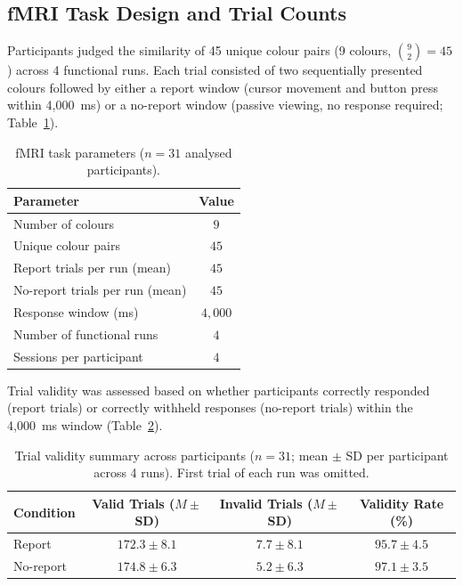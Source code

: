 \documentclass[11pt]{article}
\begin{document}
\subsection{fMRI Task Design and Trial Counts}

Participants judged the similarity of 45 unique colour pairs (9 colours, $\binom{9}{2} = 45$) across 4 functional runs. Each trial consisted of two sequentially presented colours followed by either a report window (cursor movement and button press within 4,000~ms) or a no-report window (passive viewing, no response required; Table~\ref{tab:task}).

\begin{table}[H]
\centering
\caption{fMRI task parameters ($n = 31$ analysed participants).}
\label{tab:task}
\begin{tabular}{lc}
\toprule
Parameter & Value \\
\midrule
Number of colours & $9$ \\
Unique colour pairs & $45$ \\
Report trials per run (mean) & $45$ \\
No-report trials per run (mean) & $45$ \\
Response window (ms) & $4{,}000$ \\
Number of functional runs & $4$ \\
Sessions per participant & $4$ \\
\bottomrule
\end{tabular}
\end{table}

Trial validity was assessed based on whether participants correctly responded (report trials) or correctly withheld responses (no-report trials) within the 4,000~ms window (Table~\ref{tab:validity}).

\begin{table}[H]
\centering
\caption{Trial validity summary across participants ($n = 31$; mean $\pm$ SD per participant across 4 runs). First trial of each run was omitted.}
\label{tab:validity}
\begin{tabular}{lccc}
\toprule
Condition & Valid Trials ($M \pm$ SD) & Invalid Trials ($M \pm$ SD) & Validity Rate (\%) \\
\midrule
Report & $172.3 \pm 8.1$ & $7.7 \pm 8.1$ & $95.7 \pm 4.5$ \\
No-report & $174.8 \pm 6.3$ & $5.2 \pm 6.3$ & $97.1 \pm 3.5$ \\
\bottomrule
\end{tabular}
\end{table}
\end{document}
